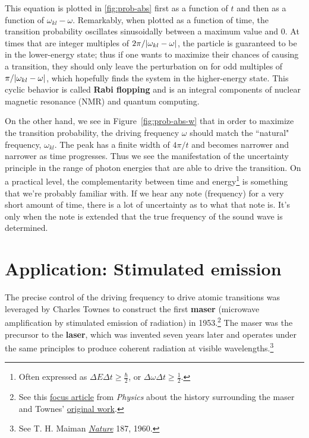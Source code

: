 This equation is plotted in \autoref{fig:prob-abs} first as a function of $t$ and then as a function of $\omega_{kl} - \omega$. 
Remarkably, when plotted as a function of time, the transition probability oscillates sinusoidally between a maximum value and 0. 
At times that are integer multiples of $2\pi / \abs{\omega_{kl} - \omega}$, the particle is guaranteed to be in the lower-energy state; thus if one wants to maximize their chances of causing a transition, they should only leave the perturbation on for odd multiples of $\pi / \abs{\omega_{kl} - \omega}$, which hopefully finds the system in the higher-energy state. 
This cyclic behavior is called \textbf{Rabi flopping} and is an integral components of nuclear magnetic resonance (NMR) and quantum computing.

On the other hand, we see in Figure~\ref{fig:prob-abs-w} that in order to maximize the transition probability, the driving frequency $\omega$ should match the ``natural" frequency, $\omega_{kl}$. 
The peak has a finite width of $4\pi/t$ and becomes narrower and narrower as time progresses. 
Thus we see the manifestation of the uncertainty principle in the range of photon energies that are able to drive the transition. 
On a practical level, the complementarity between time and energy\footnote{Often expressed as $\Delta E \Delta t \ge \frac{\hbar}{2}$, or $\Delta \omega \Delta t \ge \frac{1}{2}$.} is something that we're probably familiar with. 
If we hear any note (frequency) for a very short amount of time, there is a lot of uncertainty as to what that note is. 
It's only when the note is extended that the true frequency of the sound wave is determined.


\section{Application: Stimulated emission}

The precise control of the driving frequency to drive atomic transitions was leveraged by Charles Townes to construct the first \textbf{maser} (microwave amplification by stimulated emission of radiation) in 1953.\footnote{See this \href{https://physics.aps.org/story/v15/st4}{focus article} from \emph{Physics} about the history surrounding the maser and Townes' \href{https://journals.aps.org/pr/abstract/10.1103/PhysRev.99.1264}{original work}.} 
The maser was the precursor to the \textbf{laser}, which was invented seven years later and operates under the same principles to produce coherent radiation at visible wavelengths.\footnote{See T. H. Maiman \href{https://www.nature.com/articles/187493a0}{\emph{Nature}} 187, 1960.}

